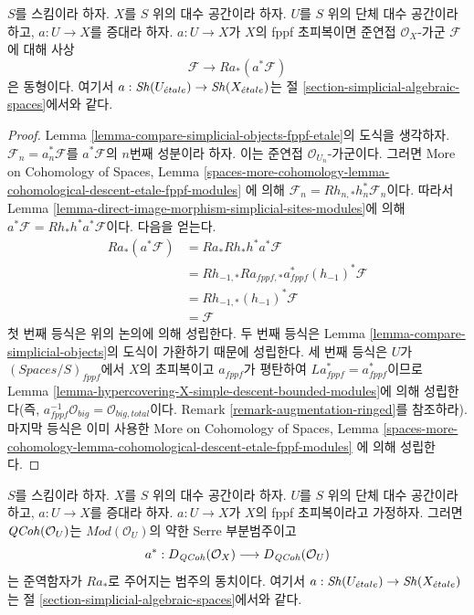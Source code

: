 \begin{lemma}
\label{lemma-cohomological-descent-qcoh-for-fppf-hypercovering}
$S$를 스킴이라 하자. $X$를 $S$ 위의 대수 공간이라 하자.
$U$를 $S$ 위의 단체 대수 공간이라 하고, $a : U \to X$를
증대라 하자. $a : U \to X$가 $X$의 fppf 초피복이면
준연접 $\mathcal{O}_X$-가군 $\mathcal{F}$에 대해 사상
$$
\mathcal{F} \to Ra_*(a^*\mathcal{F})
$$
은 동형이다. 여기서 $a : \mathop{\mathit{Sh}}\nolimits(U_{\acute{e}tale}) \to \mathop{\mathit{Sh}}\nolimits(X_{\acute{e}tale})$는
절 \ref{section-simplicial-algebraic-spaces}에서와 같다.
\end{lemma}

\begin{proof}
Lemma \ref{lemma-compare-simplicial-objects-fppf-etale}의 도식을 생각하자.
$\mathcal{F}_n = a_n^*\mathcal{F}$를 $a^*\mathcal{F}$의
$n$번째 성분이라 하자. 이는 준연접 $\mathcal{O}_{U_n}$-가군이다.
그러면 More on Cohomology of Spaces, Lemma
\ref{spaces-more-cohomology-lemma-cohomological-descent-etale-fppf-modules}
에 의해 $\mathcal{F}_n = Rh_{n, *}h_n^*\mathcal{F}_n$이다.
따라서 Lemma \ref{lemma-direct-image-morphism-simplicial-sites-modules}에 의해
$a^*\mathcal{F} = Rh_*h^*a^*\mathcal{F}$이다. 다음을 얻는다.
\begin{align*}
Ra_*(a^*\mathcal{F})
& =
Ra_*Rh_*h^*a^*\mathcal{F} \\
& =
Rh_{-1, *}Ra_{fppf, *}a_{fppf}^*(h_{-1})^*\mathcal{F} \\
& =
Rh_{-1, *}(h_{-1})^*\mathcal{F} \\
& =
\mathcal{F}
\end{align*}
첫 번째 등식은 위의 논의에 의해 성립한다. 두 번째 등식은
Lemma \ref{lemma-compare-simplicial-objects}의 도식이 가환하기 때문에
성립한다. 세 번째 등식은 $U$가
$(\textit{Spaces}/S)_{fppf}$에서 $X$의 초피복이고
$a_{fppf}$가 평탄하여 $La_{fppf}^* = a_{fppf}^*$이므로
Lemma \ref{lemma-hypercovering-X-simple-descent-bounded-modules}에 의해
성립한다(즉,
$a_{fppf}^{-1}\mathcal{O}_{big} = \mathcal{O}_{big, total}$이다.
Remark \ref{remark-augmentation-ringed}를 참조하라).
마지막 등식은 이미 사용한 More on Cohomology of Spaces, Lemma
\ref{spaces-more-cohomology-lemma-cohomological-descent-etale-fppf-modules}
에 의해 성립한다.
\end{proof}

\begin{lemma}
\label{lemma-coh-descent-qcoh-unbounded-for-fppf-hypercovering}
$S$를 스킴이라 하자. $X$를 $S$ 위의 대수 공간이라 하자.
$U$를 $S$ 위의 단체 대수 공간이라 하고, $a : U \to X$를
증대라 하자. $a : U \to X$가 $X$의 fppf 초피복이라고 가정하자.
그러면 $\mathit{QCoh}(\mathcal{O}_U)$는
$\textit{Mod}(\mathcal{O}_U)$의 약한 Serre 부분범주이고
$$
a^* : D_{\mathit{QCoh}}(\mathcal{O}_X) \longrightarrow D_{\mathit{QCoh}}(\mathcal{O}_U)
$$
는 준역함자가 $Ra_*$로 주어지는 범주의 동치이다.
여기서 $a : \mathop{\mathit{Sh}}\nolimits(U_{\acute{e}tale}) \to \mathop{\mathit{Sh}}\nolimits(X_{\acute{e}tale})$는
절 \ref{section-simplicial-algebraic-spaces}에서와 같다.
\end{lemma}

